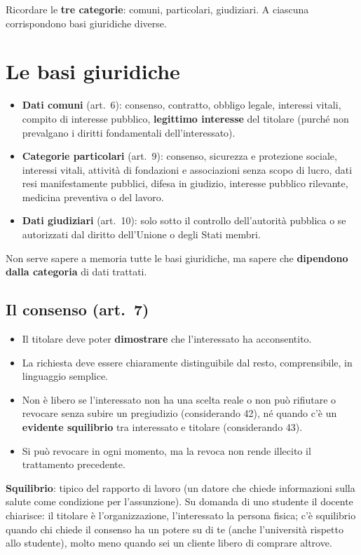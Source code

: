 \begin{esame}
Ricordare le \textbf{tre categorie}: comuni, particolari, giudiziari. A ciascuna corrispondono basi
giuridiche diverse.
\end{esame}

\section{Le basi giuridiche}
\begin{itemize}
  \item \textbf{Dati comuni} (art.~6): consenso, contratto, obbligo legale, interessi vitali, compito
    di interesse pubblico, \textbf{legittimo interesse} del titolare (purché non prevalgano i diritti
    fondamentali dell'interessato).
  \item \textbf{Categorie particolari} (art.~9): consenso, sicurezza e protezione sociale, interessi
    vitali, attività di fondazioni e associazioni senza scopo di lucro, dati resi manifestamente
    pubblici, difesa in giudizio, interesse pubblico rilevante, medicina preventiva o del lavoro.
  \item \textbf{Dati giudiziari} (art.~10): solo sotto il controllo dell'autorità pubblica o se
    autorizzati dal diritto dell'Unione o degli Stati membri.
\end{itemize}
Non serve sapere a memoria tutte le basi giuridiche, ma sapere che \textbf{dipendono dalla categoria}
di dati trattati.

\subsection{Il consenso (art.~7)}
\begin{itemize}
  \item Il titolare deve poter \textbf{dimostrare} che l'interessato ha acconsentito.
  \item La richiesta deve essere chiaramente distinguibile dal resto, comprensibile, in linguaggio
    semplice.
  \item Non è libero se l'interessato non ha una scelta reale o non può rifiutare o revocare senza
    subire un pregiudizio (considerando 42), né quando c'è un \textbf{evidente squilibrio} tra
    interessato e titolare (considerando 43).
  \item Si può revocare in ogni momento, ma la revoca non rende illecito il trattamento precedente.
\end{itemize}
\textbf{Squilibrio}: tipico del rapporto di lavoro (un datore che chiede informazioni sulla salute
come condizione per l'assunzione). Su domanda di uno studente il docente chiarisce: il titolare è
l'organizzazione, l'interessato la persona fisica; c'è squilibrio quando chi chiede il consenso ha un
potere su di te (anche l'università rispetto allo studente), molto meno quando sei un cliente libero
di comprare altrove.

